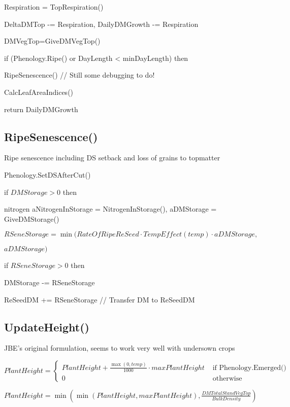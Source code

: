 \documentclass[%
]{scrartcl}
\begin{document}
      Respiration = TopRespiration()

      DeltaDMTop -= Respiration,  DailyDMGrowth -= Respiration

      DMVegTop=GiveDMVegTop()

      if (Phenology.Ripe()  or  DayLength < minDayLength) then

     \quad 	RipeSenescence()    //  Still some debugging to do!

      CalcLeafAreaIndices()


	
   return DailyDMGrowth


\subsection{RipeSenescence()}
Ripe senescence including DS setback and loss of grains to topmatter

   Phenology.SetDSAfterCut()

   if $DMStorage> 0$ then
   
   \quad	nitrogen aNitrogenInStorage = NitrogenInStorage(),
   aDMStorage = GiveDMStorage()

\quad		$RSeneStorage=\min(RateOfRipeReSeed \cdot TempEffect(temp) \cdot aDMStorage,$

  \quad\quad                  $aDMStorage)$

   \quad	if $RSeneStorage>0$ then
   	

   \quad  \quad 	DMStorage -= RSeneStorage 

     \quad  \quad    ReSeedDM += RSeneStorage //  Transfer DM to ReSeedDM
  



\subsection{UpdateHeight()}


JBE's original formulation, seems to work very well with undersown crops

$PlantHeight = \begin{cases}
                PlantHeight + \tfrac{\max(0,temp)}{1000} \cdot maxPlantHeight & \text{ if Phenology.Emerged()} \\
                0 & \text{ otherwise}
           \end{cases}$


 $PlantHeight = \min\left(\min\left(PlantHeight,maxPlantHeight\right),\tfrac{DMTotalStandVegTop}{BulkDensity}\right) $
\end{document}
